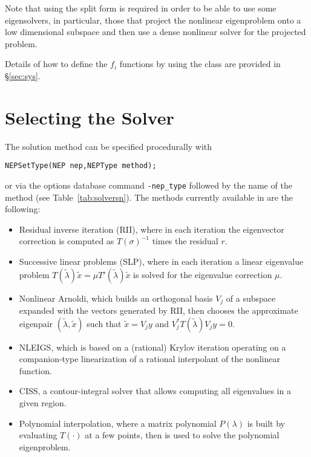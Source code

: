 Note that using the split form is required in order to be able to use some eigensolvers, in particular, those that project the nonlinear eigenproblem onto a low dimensional subspace and then use a dense nonlinear solver for the projected problem.

Details of how to define the $f_i$ functions by using the  class are provided in \S\ref{sec:sys}.

\section{Selecting the Solver}

The solution method can be specified procedurally with
	\begin{Verbatim}[fontsize=\small]
	NEPSetType(NEP nep,NEPType method);
	\end{Verbatim}
or via the options database command \Verb!-nep_type! followed by the name of the method (see Table~\ref{tab:solversn}). The methods currently available in  are the following:
\begin{itemize}
\item Residual inverse iteration (RII), where in each iteration the eigenvector correction is computed as $T(\sigma)^{-1}$ times the residual $r$.
\item Successive linear problems (SLP), where in each iteration a linear eigenvalue problem $T(\tilde\lambda)\tilde x=\mu T'(\tilde\lambda)\tilde x$ is solved for the eigenvalue correction $\mu$.
\item Nonlinear Arnoldi, which builds an orthogonal basis $V_j$ of a subspace expanded with the vectors generated by RII, then chooses the approximate eigenpair $(\tilde\lambda,\tilde x)$ such that $\tilde x=V_jy$ and $V_j^*T(\tilde\lambda)V_jy=0$.
\item NLEIGS, which is based on a (rational) Krylov iteration operating on a companion-type linearization of a rational interpolant of the nonlinear function.
\item CISS, a contour-integral solver that allows computing all eigenvalues in a given region.
\item Polynomial interpolation, where a matrix polynomial $P(\lambda)$ is built by evaluating $T(\cdot)$ at a few points, then  is used to solve the polynomial eigenproblem.
\end{itemize}

